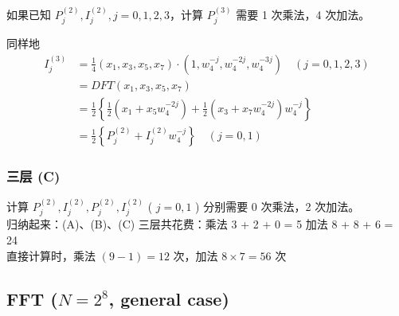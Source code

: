 \documentclass[linespread=1.5,openany]{book}%
\theoremstyle{plain}
\begin{document}
{{{					如果已知 $P_{j}^{(2)}, I_{j}^{(2)}, j=0,1,2,3$，计算 $P_{j}^{(3)}$ 需要 1 次乘法，4 次加法。
					
					同样地
					\begin{equation}
						\begin{aligned}
							I_{j}^{(3)} &= \frac{1}{4} \left( x_{1}, x_{3}, x_{5}, x_{7} \right) \cdot (1, w_{4}^{-j}, w_{4}^{-2j}, w_{4}^{-3j}) \quad (j=0,1,2,3) \\[8pt]
							&=DFT(x_1,x_3,x_5,x_7)\\[8pt]
							&= \frac{1}{2} \left\{ \frac{1}{2} \left( x_{1} + x_{5} w_{4}^{-2j} \right) + \frac{1}{2} \left( x_{3} + x_{7} w_{4}^{-2j} \right) w_{4}^{-j} \right\} \\[8pt]
							&= \frac{1}{2} \left\{ P_{j}^{(2)} + I_{j}^{(2)} w_{4}^{-j} \right\} \quad (j=0,1)
						\end{aligned}
					\end{equation}
					
					\subsubsection{三层 (C)}
					
					计算 $P_{j}^{(2)}, I_{j}^{(2)}, P_{j}^{(2)}, I_{j}^{(2)}$ ( $j=0,1$ ) 分别需要 0 次乘法，2 次加法。\\
					归纳起来：(A)、(B)、(C) 三层共花费：乘法 3 + 2 + 0 = 5 \quad 加法 8 + 8 + 6 = 24\\
					直接计算时，乘法 $(9-1)= 12$ 次，加法 $8 \times 7 = 56$ 次
					\subsection{FFT ($N = 2^8$, general case)}
					
}}}
\end{document}

